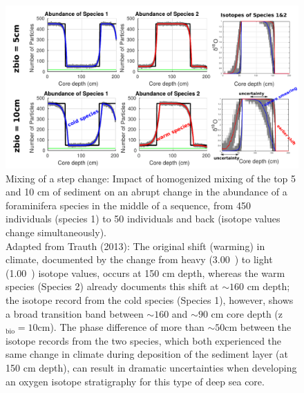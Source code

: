 \documentclass[a4paper,oneside,9pt]{article}
\begin{document}
\begin{figure}[hbp]
\begin{center}
	\includegraphics[width=1.0\textwidth]{../figures/../figures/stepchange2_5+10cm_background.pdf}
	\caption{Mixing of a step change: Impact of homogenized mixing of the top 5 and 10 cm of sediment on an abrupt change in the abundance of a foraminifera species in the middle of a sequence, 
	from 450 individuals (species 1) to 50 individuals and back (isotope values change simultaneously). \\
	Adapted from Trauth (2013): The original shift (warming) in climate, documented by the change from heavy (3.00\textperthousand\ ) to light (1.00\textperthousand\ ) isotope values, occurs at 150 cm depth, whereas the warm
	species (Species 2) already documents this shift at $\sim 160$ cm depth; the isotope record from the cold species (Species 1), however, shows a broad transition band between $\sim 160$ and $\sim 90$ cm core depth (z$_\mathrm{bio}=10$cm).
	The phase difference of more than $\sim 50$cm between the isotope records from the two species, which both experienced the same change in climate during deposition of the sediment layer (at 150 cm depth), 
	can result in dramatic uncertainties when developing an oxygen isotope stratigraphy for this type of deep sea core.
}\label{fig:stepchange}
\end{center}
\end{figure}
\end{document}
